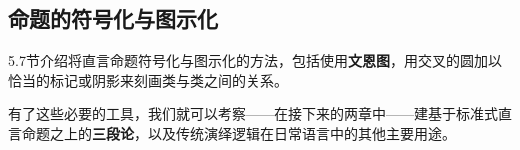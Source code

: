 \subsection{命题的符号化与图示化}
5.7节介绍将直言命题符号化与图示化的方法，包括使用\textbf{文恩图}，用交叉的圆加以恰当的标记或阴影来刻画类与类之间的关系。

\begin{center}
\end{center}

有了这些必要的工具，我们就可以考察——在接下来的两章中——建基于标准式直言命题之上的\textbf{三段论}，以及传统演绎逻辑在日常语言中的其他主要用途。 

\printbibliography[heading=subbibliography,title={第5章参考文献}] 